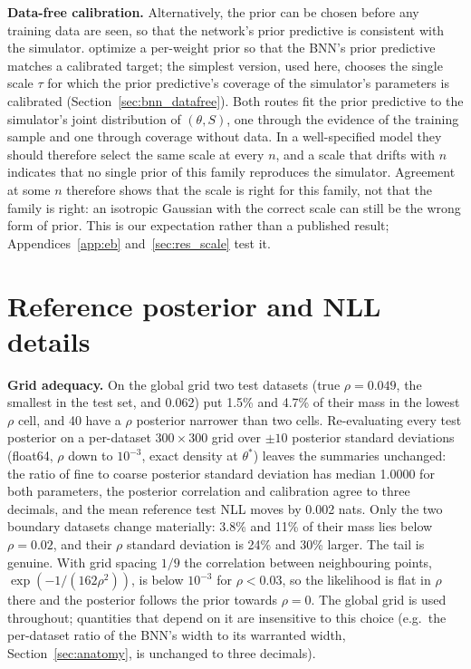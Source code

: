 \documentclass[11pt]{article}
\begin{document}
\textbf{Data-free calibration.} Alternatively, the prior can be chosen before any training data are seen, so that
the network's prior predictive is consistent with the simulator. \citet{delaunoy2024lowbudget} optimize a per-weight
prior so that the BNN's prior predictive matches a calibrated target; the simplest version, used here, chooses the
single scale $\tau$ for which the prior predictive's coverage of the simulator's parameters is calibrated
(Section~\ref{sec:bnn_datafree}). Both routes fit the prior predictive to the simulator's joint distribution of
$(\theta,S)$, one through the evidence of the training sample and one through coverage without data. In a
well-specified model they should therefore select the same scale at every $n$, and a scale that drifts with $n$
indicates that no single prior of this family reproduces the simulator. Agreement at some $n$ therefore shows that the
scale is right for this family, not that the family is right: an isotropic Gaussian with the correct scale can still be
the wrong form of prior. This is our expectation rather than a
published result; Appendices~\ref{app:eb} and~\ref{sec:res_scale} test it.

\section{Reference posterior and NLL details}
\label{app:ref}
\textbf{Grid adequacy.} On the global grid two test datasets (true $\rho=0.049$, the smallest in the test set,
and $0.062$) put 1.5\% and 4.7\% of their mass in the lowest $\rho$ cell, and 40 have a $\rho$ posterior
narrower than two cells. Re-evaluating every test posterior on a per-dataset $300\times300$ grid over
$\pm10$ posterior standard deviations (float64, $\rho$ down to $10^{-3}$, exact density at $\theta^*$) leaves
the summaries unchanged: the ratio of fine to coarse posterior standard deviation has median 1.0000 for both
parameters, the posterior correlation and calibration agree to three decimals, and the mean reference test NLL
moves by 0.002 nats. Only the two boundary datasets change materially: 3.8\% and 11\% of their mass lies below
$\rho=0.02$, and their $\rho$ standard deviation is 24\% and 30\% larger. The tail is genuine. With grid
spacing $1/9$ the correlation between neighbouring points, $\exp(-1/(162\rho^2))$, is below $10^{-3}$ for
$\rho<0.03$, so the likelihood is flat in $\rho$ there and the posterior follows the prior towards
$\rho=0$. The global grid is used throughout; quantities that depend on it are insensitive to this choice
(e.g.\ the per-dataset ratio of the BNN's width to its warranted width, Section~\ref{sec:anatomy}, is unchanged to three
decimals).
\end{document}
